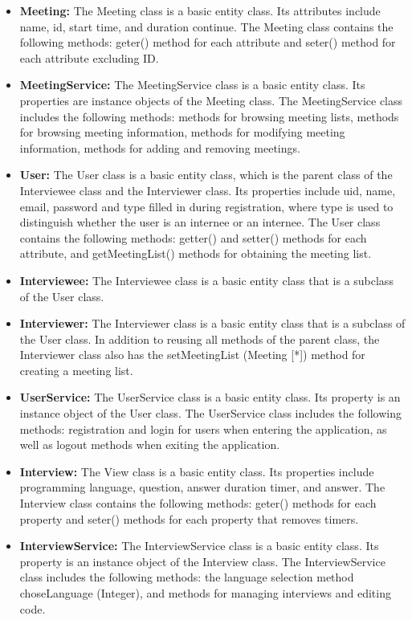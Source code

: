 \documentclass{article}
\begin{document}
\begin{itemize}
  \item \textbf{Meeting:} The Meeting class is a basic entity class. Its attributes include name, id, start time, and duration continue. The Meeting class contains the following methods: geter() method for each attribute and seter() method for each attribute excluding ID.
  \item \textbf{MeetingService:} The MeetingService class is a basic entity class. Its properties are instance objects of the Meeting class. The MeetingService class includes the following methods: methods for browsing meeting lists, methods for browsing meeting information, methods for modifying meeting information, methods for adding and removing meetings.
  \item \textbf{User:} The User class is a basic entity class, which is the parent class of the Interviewee class and the Interviewer class. Its properties include uid, name, email, password and type filled in during registration, where type is used to distinguish whether the user is an internee or an internee. The User class contains the following methods: getter() and setter() methods for each attribute, and getMeetingList() methods for obtaining the meeting list.
  \item \textbf{Interviewee:} The Interviewee class is a basic entity class that is a subclass of the User class.
  \item \textbf{Interviewer:} The Interviewer class is a basic entity class that is a subclass of the User class. In addition to reusing all methods of the parent class, the Interviewer class also has the setMeetingList (Meeting [*]) method for creating a meeting list.
  \item \textbf{UserService:} The UserService class is a basic entity class. Its property is an instance object of the User class. The UserService class includes the following methods: registration and login for users when entering the application, as well as logout methods when exiting the application.
  \item \textbf{Interview:} The View class is a basic entity class. Its properties include programming language, question, answer duration timer, and answer. The Interview class contains the following methods: geter() methods for each property and seter() methods for each property that removes timers.
  \item \textbf{InterviewService:} The InterviewService class is a basic entity class. Its property is an instance object of the Interview class. The InterviewService class includes the following methods: the language selection method choseLanguage (Integer), and methods for managing interviews and editing code.

\end{itemize}
\end{document}

